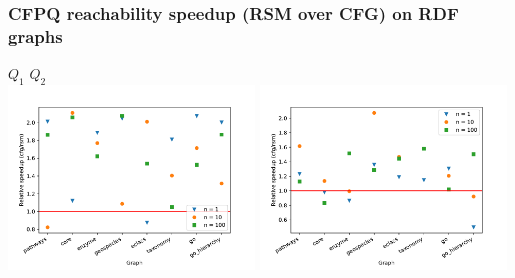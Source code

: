 \documentclass[xcolor=table,aspectratio=169]{beamer}
\begin{document}
\begin{frame}[fragile] \frametitle{CFPQ reachability speedup (RSM over CFG) on RDF graphs}  
  \begin{center}   
    $Q_1$ \hspace{7cm} $Q_2$     \\
    \includegraphics[width=0.49\textwidth]{pictures/g1_kotgll_result.pdf}
    \includegraphics[width=0.49\textwidth]{pictures/g2_kotgll_result.pdf}
  \end{center}
\end{frame}
\end{document}
